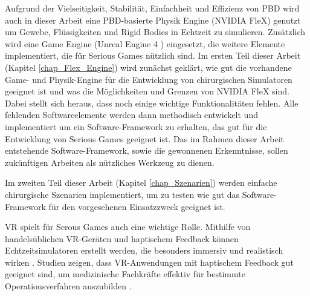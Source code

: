Aufgrund der Vielseitigkeit, Stabilität, Einfachheit und Effizienz von PBD wird auch in dieser Arbeit eine PBD-basierte Physik Engine (NVIDIA FleX) genutzt um Gewebe, Flüssigkeiten und Rigid Bodies in Echtzeit zu simulieren. Zusätzlich wird eine Game Engine (Unreal Engine 4 \cite{UE4FlexDoc}) eingesetzt, die weitere Elemente implementiert, die für Serious Games nützlich sind. Im ersten Teil dieser Arbeit (Kapitel \ref{chap_Flex_Engine}) wird zunächst geklärt, wie gut die vorhandene Game- und Physik-Engine für die Entwicklung von chirurgischen Simulatoren geeignet ist und was die Möglichkeiten und Grenzen von NVIDIA FleX sind. Dabei stellt sich heraus, dass noch einige wichtige Funktionalitäten fehlen. Alle fehlenden Softwareelemente werden dann methodisch entwickelt und implementiert um ein Software-Framework zu erhalten, das gut für die Entwicklung von Serious Games geeignet ist. Das im Rahmen dieser Arbeit entstehende Software-Framework, sowie die gewonnenen Erkenntnisse, sollen zukünftigen Arbeiten als nützliches Werkzeug zu dienen.

Im zweiten Teil dieser Arbeit (Kapitel \ref{chap_Szenarien}) werden einfache chirurgische Szenarien implementiert, um zu testen wie gut das Software-Framework für den vorgesehenen Einsatzzweck geeignet ist. 

\ac{VR} spielt für Serous Games auch eine wichtige Rolle. 
Mithilfe von handelsüblichen VR-Geräten und haptischem Feedback können Echtzeitsimulatoren erstellt werden, die besonders immersiv und realistisch wirken \cite{VRSim20}. 
Studien zeigen, dass VR-Anwendungen mit haptischem Feedback gut geeignet sind, um medizinische Fachkräfte effektiv für bestimmte Operationsverfahren auszubilden  \cite{VRHapticSim}.

